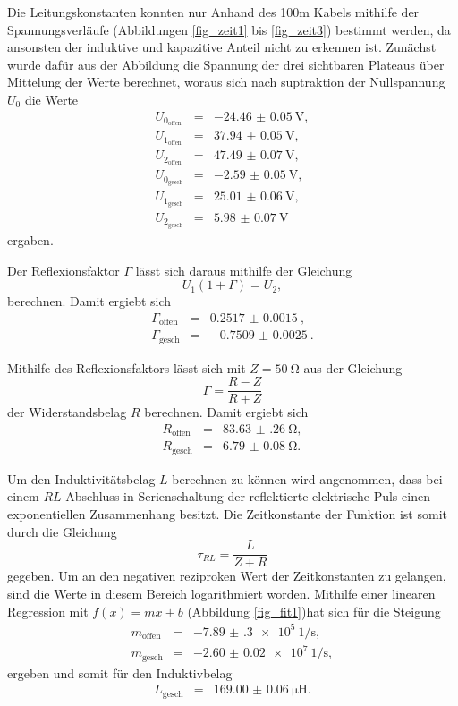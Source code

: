 Die Leitungskonstanten konnten nur Anhand des 100m Kabels mithilfe der Spannungsverläufe (Abbildungen \ref{fig_zeit1} bis \ref{fig_zeit3}) bestimmt werden, da ansonsten der induktive und kapazitive Anteil nicht zu erkennen ist.
Zunächst wurde dafür aus der Abbildung die Spannung der drei sichtbaren Plateaus über Mittelung der Werte berechnet, woraus sich nach suptraktion der Nullspannung $U_0$ die Werte
\begin{eqnarray}
	U_{0_\text{offen}} &=& \SI{-24.46(5)}{\volt},\\
	U_{1_\text{offen}} &=& \SI{37.94(5)}{\volt},\\
	U_{2_\text{offen}} &=& \SI{47.49(7)}{\volt},\\
	U_{0_\text{gesch}} &=& \SI{-2.59(5)}{\volt},\\
	U_{1_\text{gesch}} &=& \SI{25.01(6)}{\volt},\\
	U_{2_\text{gesch}} &=& \SI{5.98(7)}{\volt}
\end{eqnarray}
ergaben.

Der Reflexionsfaktor $\Gamma$ lässt sich daraus mithilfe der Gleichung
\begin{equation}
	U_1 (1+\Gamma) = U_2,
\end{equation}
 berechnen.
Damit ergiebt sich
\begin{eqnarray}
	\Gamma_\text{offen} &=& \SI{0.2517(15)}{},\\
	\Gamma_\text{gesch} &=& \SI{-0.7509(25)}{}.
\end{eqnarray}

Mithilfe des Reflexionsfaktors lässt sich mit $Z=\SI{50}{\ohm}$ aus der Gleichung
\begin{equation}
	\Gamma = \frac{R-Z}{R+Z}
\end{equation}
der Widerstandsbelag $R$ berechnen.
Damit ergiebt sich
\begin{eqnarray}
	R_\text{offen} &=& \SI{83.63(26)}{\ohm},\\
	R_\text{gesch} &=& \SI{6.79(8)}{\ohm}.
\end{eqnarray}

Um den Induktivitätsbelag $L$ berechnen zu können wird angenommen, dass bei einem $RL$ Abschluss in Serienschaltung der reflektierte elektrische Puls einen exponentiellen Zusammenhang besitzt.
Die Zeitkonstante der Funktion ist somit durch die Gleichung
\begin{equation}
	\tau_{RL} = \frac{L}{Z+R}
\end{equation}
gegeben.
Um an den negativen reziproken Wert der Zeitkonstanten zu gelangen, sind die Werte in diesem Bereich logarithmiert worden.
Mithilfe einer linearen Regression mit $f(x)=mx+b$ (Abbildung \ref{fig_fit1})hat sich für die Steigung
\begin{eqnarray}
	m_\text{offen} &=& \SI{-7.89(30)e5}{1\per\second},\\
	m_\text{gesch} &=& \SI{-2.60(2)e7}{1\per\second},
\end{eqnarray}
ergeben und somit für den Induktivbelag
\begin{eqnarray}
	L_\text{gesch} &=& \SI{169.00(6)}{\micro\henry}.
\end{eqnarray}

